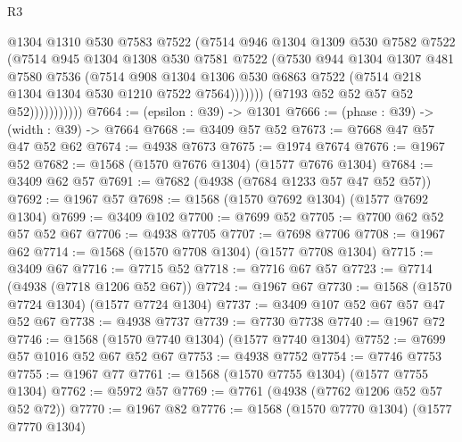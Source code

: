 \begin{lexlean}{R3}
\begin{coremodule}
                            @1304
                            @1310
                            @530
                            @7583
                            @7522
                            (@7514
                              @946
                              @1304
                              @1309
                              @530
                              @7582
                              @7522
                              (@7514
                                @945
                                @1304
                                @1308
                                @530
                                @7581
                                @7522
                                (@7530
                                  @944
                                  @1304
                                  @1307
                                  @481
                                  @7580
                                  @7536
                                  (@7514
                                    @908
                                    @1304
                                    @1306
                                    @530
                                    @6863
                                    @7522
                                    (@7514 @218 @1304 @1304 @530 @1210 @7522 @7564)))))))
                        (@7193 @52 @52 @57 @52 @52)))))))))))
@7664 := (epsilon : @39) -> @1301
@7666 := (phase : @39) -> (width : @39) -> @7664
@7668 := @3409 @57 @52
@7673 := @7668 @47 @57 @47 @52 @62
@7674 := @4938 @7673
@7675 := @1974 @7674
@7676 := @1967 @52
@7682 := @1568 (@1570 @7676 @1304) (@1577 @7676 @1304)
@7684 := @3409 @62 @57
@7691 := @7682 (@4938 (@7684 @1233 @57 @47 @52 @57))
@7692 := @1967 @57
@7698 := @1568 (@1570 @7692 @1304) (@1577 @7692 @1304)
@7699 := @3409 @102
@7700 := @7699 @52
@7705 := @7700 @62 @52 @57 @52 @67
@7706 := @4938 @7705
@7707 := @7698 @7706
@7708 := @1967 @62
@7714 := @1568 (@1570 @7708 @1304) (@1577 @7708 @1304)
@7715 := @3409 @67
@7716 := @7715 @52
@7718 := @7716 @67 @57
@7723 := @7714 (@4938 (@7718 @1206 @52 @67))
@7724 := @1967 @67
@7730 := @1568 (@1570 @7724 @1304) (@1577 @7724 @1304)
@7737 := @3409 @107 @52 @67 @57 @47 @52 @67
@7738 := @4938 @7737
@7739 := @7730 @7738
@7740 := @1967 @72
@7746 := @1568 (@1570 @7740 @1304) (@1577 @7740 @1304)
@7752 := @7699 @57 @1016 @52 @67 @52 @67
@7753 := @4938 @7752
@7754 := @7746 @7753
@7755 := @1967 @77
@7761 := @1568 (@1570 @7755 @1304) (@1577 @7755 @1304)
@7762 := @5972 @57
@7769 := @7761 (@4938 (@7762 @1206 @52 @57 @52 @72))
@7770 := @1967 @82
@7776 := @1568 (@1570 @7770 @1304) (@1577 @7770 @1304)

\end{coremodule}
\end{lexlean}
